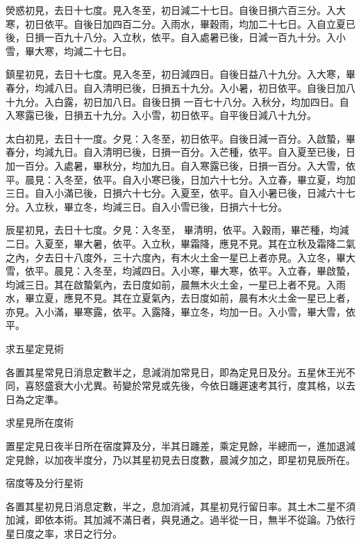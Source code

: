 \begin{pinyinscope}
 熒惑初見，去日十七度。見入冬至，初日減二十七日。自後日損六百三分。入大寒，初日依平。自後日加四百二分。入雨水，畢穀雨，均加二十七日。入自立夏已後，日損一百九十八分。入立秋，依平。自入處暑已後，日減一百九十分。入小雪，畢大寒，均減二十七日。



 鎮星初見，去日十七度。見入冬至，初日減四日。自後日益八十九分。入大寒，畢春分，均減八日。自入清明已後，日損五十九分。入小暑，初日依平。自後日加八十九分。入白露，初日加八日。自後日損
 一百七十八分。入秋分，均加四日。自入寒露已後，日損五十九分。入小雪，初日依平。自平後日減八十九分。



 太白初見，去日十一度。夕見：入冬至，初日依平。自後日減一百分。入啟蟄，畢春分，均減九日。自入清明已後，日損一百分。入芒種，依平。自入夏至已後，日加一百分。入處暑，畢秋分，均加九日。自入寒露已後，日損一百分。入大雪，依平。晨見：入冬至，依平。自入小寒已後，日加六十七分。入立春，畢立夏，均加三日。自入小滿已後，日損六十七分。入夏至，依平。自入小暑已後，日減六十七分。入立秋，畢立冬，均減三日。自入小雪已後，日損六十七分。



 辰星初見，去日十七度。夕見：入冬至，
 畢清明，依平。入穀雨，畢芒種，均減二日。入夏至，畢大暑，依平。入立秋，畢霜降，應見不見。其在立秋及霜降二氣之內，夕去日十八度外，三十六度內，有木火土金一星已上者亦見。入立冬，畢大雪，依平。晨見：入冬至，均減四日。入小寒，畢大寒，依平。入立春，畢啟蟄，均減三日。其在啟蟄氣內，去日度如前，晨無木火土金，一星已上者不見。入雨水，畢立夏，應見不見。其在立夏氣內，去日度如前，晨有木火土金一星已上者，亦見。入小滿，畢寒露，依平。入露降，畢立冬，均加一日。入小雪，畢大雪，依平。



 求五星定見術



 各置其星常見日消息定數半之，息減消加常見日，即為定見日及分。五星休王光不同，喜怒盛衰大小尤異。茍變於常見或先後，今依日躔遲速考其行，度其格，以去日為之定準。



 求星見所在度術



 置星定見日夜半日所在宿度算及分，半其日躔差，乘定見餘，半總而一，進加退減定見餘，以加夜半度分，乃以其星初見去日度數，晨減夕加之，即星初見辰所在。



 宿度等及分行星術



 各置其星初見日消息定數，半之，息加消減，其星初見行留日率。其土木二星不須加減，即依本術。其加減不滿日者，與見通之。過半從一日，無半不從論。乃依行星日度之率，求日之行分。




\end{pinyinscope}
